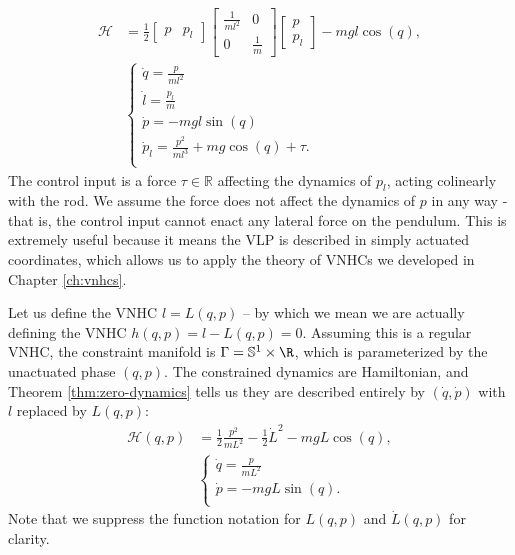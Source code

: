 \begin{align}\label{eqn:vlp-hamiltonian-with-pl}
   \mathcal{H} &= \frac{1}{2} \begin{bmatrix} p & p_l \end{bmatrix}
      \begin{bmatrix}
         \frac{1}{ml^2}  & 0 \\
         0 & \frac{1}{m}
      \end{bmatrix} \begin{bmatrix} p \\ p_l \end{bmatrix} - mgl\cos(q)
      , \\
     &\begin{cases}
        \dot{q} = \frac{p}{ml^2} \\
        \dot{l} = \frac{p_l}{m} \\
        \dot{p} = -mgl\sin(q) \\
        \dot{p}_l = \frac{p^2}{ml^3} + mg\cos(q) + \tau
        . \\
   \end{cases} \nonumber
\end{align}
The control input is a force \(\tau \in \mathbb{R}\) affecting the dynamics of
\(p_l\), acting colinearly with the rod.
We assume the force does not affect the dynamics of \(p\) in any way -
that is, the control input cannot enact any lateral force on the pendulum.
This is extremely useful because it means the VLP is described in simply
actuated coordinates, which allows us to apply the theory of VNHCs we
developed in Chapter \ref{ch:vnhcs}.

Let us define the VNHC \(l = L(q,p)\) -- by which we mean we are
actually defining the VNHC \(h(q,p) = l - L(q,p) = 0\).
Assuming this is a regular VNHC, the constraint manifold is
\(\Gamma = \mathbb{S}^1 \times \R\), which is parameterized by the unactuated
phase \((q,p)\).
The constrained dynamics are Hamiltonian, and Theorem \ref{thm:zero-dynamics}
tells us they are described entirely by \((\dot{q},\dot{p})\) with \(l\)
replaced by \(L(q,p)\):
\begin{align}\label{eqn:vlp-hamiltonian}
   \mathcal{H}(q,p) &= \frac{1}{2} \frac{p^2}{mL^2} - \frac{1}{2}\dot{L}^2 -
      mgL\cos(q)
   , \\
  &\begin{cases}
      \dot{q} = \frac{p}{m L^2} \\
      \dot{p} = -mgL\sin(q)
      . \\ 
   \end{cases} \nonumber
\end{align}
Note that we suppress the function notation for \(L(q,p)\) and
\(\dot{L}(q,p)\) for clarity.

